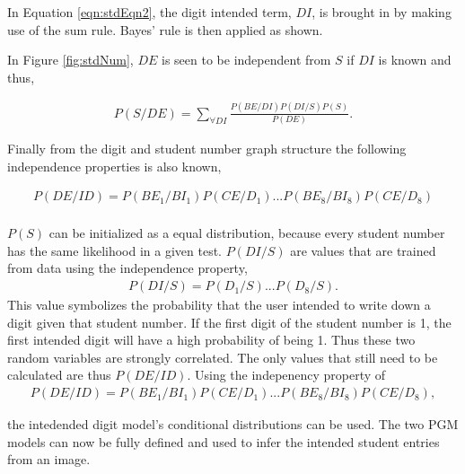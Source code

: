 In Equation \ref{eqn:stdEqn2}, the digit intended term, $DI$, is brought in by making use of the sum rule. Bayes' rule is then applied as shown.

In Figure \ref{fig:stdNum}, $DE$ is seen to be independent from $S$ if $DI$ is known and thus,

\begin{align}
  P(S/DE)	=  \sum_{\forall DI}^{}  \frac{P(BE/DI)P(DI/S)P(S)}{P(DE)}.
\label{eqn:stdEqn3}
\end{align}

Finally from the digit and student number graph structure the following independence properties is also known,



\begin{align}
P(DE/ID) = P(BE_1/BI_1)P(CE/D_1)...P(BE_8/BI_8)P(CE/D_8)\\
\label{eqn:stdEqn4}
\end{align}


$P(S)$ can be initialized as a equal distribution, because every student number has the same likelihood in a given test. $P(DI/S)$ are values that are trained from data using the independence property, 
\begin{align}
P(DI/S) = P(D_1/S)...P(D_8/S).
\label{eqn:stdEqn4}
\end{align}
This value symbolizes the probability that the user intended to write down a digit given that student number. If the first digit of the student number is 1, the first intended digit will have a high probability of being 1. Thus these two random variables are strongly correlated. The only values that still need to be calculated are thus $P(DE/ID)$. Using the indepenency property of \begin{align}
P(DE/ID) = P(BE_1/BI_1)P(CE/D_1)...P(BE_8/BI_8)P(CE/D_8),
\label{eqn:stdEqn4}
\end{align}

the intedended digit model's conditional distributions can be used. The two PGM models can now be fully defined and used to infer the intended student entries from an image.
